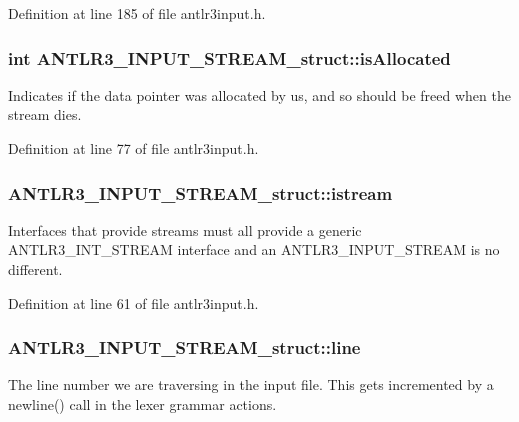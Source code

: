 Definition at line 185 of file antlr3input.\-h.

\hypertarget{struct_a_n_t_l_r3___i_n_p_u_t___s_t_r_e_a_m__struct_a6fb47df51fb05073a1d38877d6f0f16d}{
\subsubsection[{is\-Allocated}]{\setlength{\rightskip}{0pt plus 5cm}int A\-N\-T\-L\-R3\-\_\-\-I\-N\-P\-U\-T\-\_\-\-S\-T\-R\-E\-A\-M\-\_\-struct\-::is\-Allocated}}\label{struct_a_n_t_l_r3___i_n_p_u_t___s_t_r_e_a_m__struct_a6fb47df51fb05073a1d38877d6f0f16d}
Indicates if the data pointer was allocated by us, and so should be freed when the stream dies. 

Definition at line 77 of file antlr3input.\-h.

\hypertarget{struct_a_n_t_l_r3___i_n_p_u_t___s_t_r_e_a_m__struct_ac90101686f579652c058d24f5a7bad35}{
\subsubsection[{istream}]{ A\-N\-T\-L\-R3\-\_\-\-I\-N\-P\-U\-T\-\_\-\-S\-T\-R\-E\-A\-M\-\_\-struct\-::istream}}\label{struct_a_n_t_l_r3___i_n_p_u_t___s_t_r_e_a_m__struct_ac90101686f579652c058d24f5a7bad35}
Interfaces that provide streams must all provide a generic A\-N\-T\-L\-R3\-\_\-\-I\-N\-T\-\_\-\-S\-T\-R\-E\-A\-M interface and an A\-N\-T\-L\-R3\-\_\-\-I\-N\-P\-U\-T\-\_\-\-S\-T\-R\-E\-A\-M is no different. 

Definition at line 61 of file antlr3input.\-h.

\hypertarget{struct_a_n_t_l_r3___i_n_p_u_t___s_t_r_e_a_m__struct_a6339fbb583899850cc6647706c60f197}{
\subsubsection[{line}]{ A\-N\-T\-L\-R3\-\_\-\-I\-N\-P\-U\-T\-\_\-\-S\-T\-R\-E\-A\-M\-\_\-struct\-::line}}\label{struct_a_n_t_l_r3___i_n_p_u_t___s_t_r_e_a_m__struct_a6339fbb583899850cc6647706c60f197}
The line number we are traversing in the input file. This gets incremented by a newline() call in the lexer grammar actions. 

